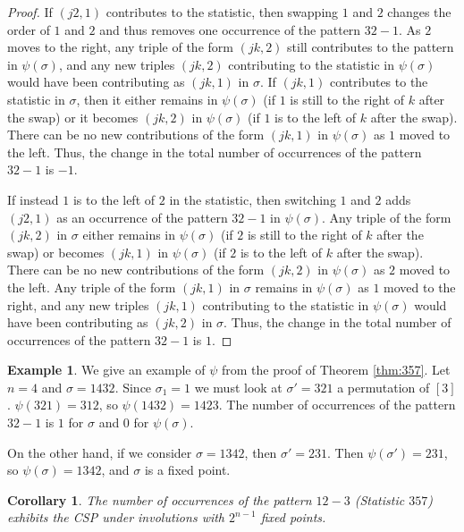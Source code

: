 \documentclass{amsart}
\newtheorem{cor}[thm]{Corollary}
\theoremstyle{definition}
\newtheorem{example}[thm]{Example}
\begin{document}
\begin{proof}
  If $(j2,1)$ contributes to the statistic, then swapping $1$ and $2$ changes the order of $1$ and $2$ and thus removes one occurrence of the pattern $32-1$. As $2$ moves to the right, any triple of the form $(jk, 2)$ still contributes to the pattern in $\psi(\sigma)$, and any new triples $(jk, 2)$ contributing to the statistic in $\psi(\sigma)$ would have been contributing as $(jk, 1)$ in $\sigma$. If $(jk, 1)$ contributes to the statistic in $\sigma$, then it either remains in $\psi(\sigma)$ (if $1$ is still to the right of $k$ after the swap) or it becomes $(jk, 2)$ in $\psi(\sigma)$ (if $1$ is to the left of $k$ after the swap). There can be no new contributions of the form $(jk, 1)$ in $\psi(\sigma)$ as $1$ moved to the left. Thus, the change in the total number of occurrences of the pattern $32-1$ is $-1$.

  If instead $1$ is to the left of $2$ in the statistic, then switching $1$ and $2$ adds $(j2, 1)$ as an occurrence of the pattern $32-1$ in $\psi(\sigma)$. Any triple of the form $(jk, 2)$ in $\sigma$ either remains in $\psi(\sigma)$ (if $2$ is still to the right of $k$ after the swap) or becomes $(jk, 1)$ in $\psi(\sigma)$ (if $2$ is to the left of $k$ after the swap). There can be no new contributions of the form $(jk, 2)$ in $\psi(\sigma)$ as $2$ moved to the left. Any triple of the form $(jk, 1)$ in $\sigma$ remains in $\psi(\sigma)$ as $1$ moved to the right, and any new triples $(jk, 1)$ contributing to the statistic in $\psi(\sigma)$ would have been contributing as $(jk, 2)$ in $\sigma$. Thus, the change in the total number of occurrences of the pattern $32-1$ is $1$.
\end{proof}

\begin{example}
  We give an example of $\psi$ from the proof of Theorem \ref{thm:357}. Let $n=4$ and $\sigma = 1432$. Since $\sigma_1=1$ we must look at $\sigma' = 321$ a permutation of $[3]$. $\psi(321) = 312$, so $\psi(1432) = 1423$. The number of occurrences of the pattern $32-1$ is $1$ for $\sigma$ and 0 for $\psi(\sigma)$.

  On the other hand, if we consider $\sigma = 1342$, then $\sigma' = 231$. Then $\psi(\sigma') = 231$, so $\psi(\sigma) = 1342$, and $\sigma$ is a fixed point.
\end{example}

\begin{cor}\label{cor:357} The number of occurrences of the pattern $12-3$ (Statistic $357$) exhibits the CSP under involutions with $2^{n-1}$ fixed points.
\end{cor}
\end{document}
